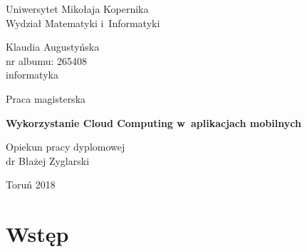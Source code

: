 \documentclass[12pt,a4paper,twoside,titlepage,openright]{book}
\begin{document}

\begin{titlepage}


\vspace*{1cm}
\begin{center}
\begin{Large}
Uniwersytet Mikołaja Kopernika\\[1mm]
Wydział Matematyki i~Informatyki\\[1mm]
\end{Large}
\end{center}

\vfill

\begin{center}
{\Large Klaudia Augustyńska}\\
nr albumu: 265408\\
informatyka
\end{center}

\vfill

\begin{center}
{\Large Praca magisterska}
\end{center}

\vspace{0.5cm}

\begin{center}
{\Huge \textbf{Wykorzystanie Cloud Computing w~aplikacjach mobilnych}}
\end{center}

\vspace{2cm}
\hfill
\begin{minipage}{6.5cm}
Opiekun pracy dyplomowej\\
dr Błażej Zyglarski
\end{minipage}

\vfill

\begin{center}
Toruń 2018
\end{center}

\end{titlepage}

\clearpage{\pagestyle{empty}\cleardoublepage}

\tableofcontents
 
\chapter*{Wstęp}
\end{document}
